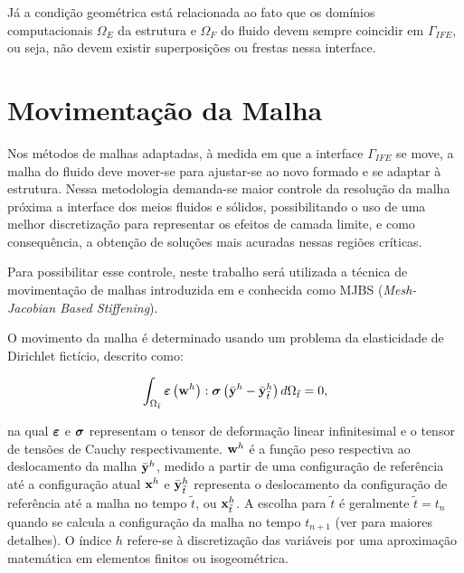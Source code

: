 \documentclass[tese_patricia]{subfiles}
\begin{document}
Já a condição geométrica está relacionada ao fato que os domínios computacionais $\Omega_E$ da estrutura e $\Omega_F$ do fluido devem sempre coincidir em $\Gamma_{IFE}$, ou seja, não devem existir superposições ou frestas nessa interface.

\section{Movimentação da Malha}

Nos métodos de malhas adaptadas, à medida em que a interface $\Gamma_{IFE}$ se move, a malha do fluido deve mover-se para ajustar-se ao novo formado e se adaptar à estrutura. Nessa metodologia demanda-se maior controle da resolução da malha próxima a interface dos meios fluidos e sólidos, possibilitando o uso de uma melhor discretização para representar os efeitos de camada limite, e como consequência, a obtenção de soluções mais acuradas nessas regiões críticas.

Para possibilitar esse controle, neste trabalho será utilizada a técnica de movimentação de malhas introduzida em  e  conhecida como MJBS (\textit{Mesh-Jacobian Based Stiffening}).

O movimento da malha é determinado usando um problema da elasticidade de Dirichlet fictício, descrito como:

\begin{align}
	\int_{\Omega_{\tilde{t}}} \bm{\varepsilon} \left(\mathbf{w}^h\right) : \boldsymbol{\sigma} \left(\bar{\mathbf{y}}^h - \bar{\mathbf{y}}^h_{\tilde{t}}\right) d\Omega_{\tilde{t}} = 0,
	\label{eq:elasticityequation}
\end{align}

\noindent na qual $\bm{\varepsilon}$ e $\boldsymbol{\sigma}$ representam o tensor de deformação linear infinitesimal e o tensor de tensões de Cauchy respectivamente. $\mathbf{w}^h$ é a função peso respectiva ao deslocamento da malha  $\bar{\mathbf{y}}^h$, medido a partir de uma configuração de referência até a configuração atual $\mathbf{x}^h$ e 
$\bar{\mathbf{y}}^h_{\tilde{t}}$ representa o deslocamento da configuração de referência até a malha no tempo ${\tilde{t}}$, ou $\mathbf{x}^h_{\tilde{t}}$. 
A escolha para ${\tilde{t}}$ é geralmente ${\tilde{t}} = {t_{n}}$ quando se calcula a configuração da malha no tempo ${t_{n+1}}$ (ver  para maiores detalhes). O índice $h$ refere-se à discretização das variáveis por uma aproximação matemática em elementos finitos ou isogeométrica.
\end{document}
